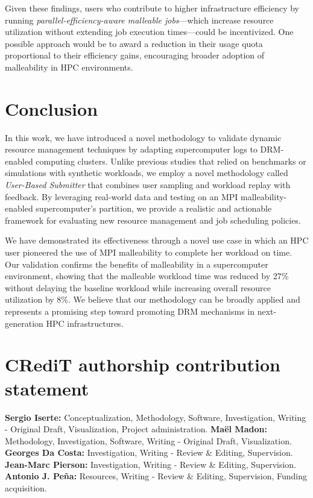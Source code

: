 \documentclass[a4paper,fleqn]{cas-dc}
\begin{document}
Given these findings, users who contribute to higher infrastructure efficiency by running \textit{parallel-efficiency-aware malleable jobs}—which increase resource utilization without extending job execution times—could be incentivized. One possible approach would be to award a reduction in their usage quota proportional to their efficiency gains, encouraging broader adoption of malleability in HPC environments.  

\section{Conclusion}\label{sec:conclusion}
In this work, we have introduced a novel methodology to validate dynamic resource management techniques by adapting supercomputer logs to DRM-enabled computing clusters.
Unlike previous studies that relied on benchmarks or simulations with synthetic workloads, we employ a novel methodology called \textit{User-Based Submitter} that combines user sampling and workload replay with feedback.
By leveraging real-world data and testing on an MPI malleability-enabled supercomputer's partition, we provide a realistic and actionable framework for evaluating new resource management and job scheduling policies.

We have demonstrated its effectiveness through a novel use case in which an HPC user pioneered the use of MPI malleability to complete her workload on time. Our validation confirms the benefits of malleability in a supercomputer environment, showing that the malleable workload time was reduced by 27\% without delaying the baseline workload while increasing overall resource utilization by 8\%. We believe that our methodology can be broadly applied and represents a promising step toward promoting DRM mechanisms in next-generation HPC infrastructures.


\section*{CRediT authorship contribution statement}
\textbf{Sergio Iserte:} Conceptualization, Methodology, Software,
Investigation, Writing - Original Draft, Visualization, Project administration.
\textbf{Maël Madon:}  Methodology, Investigation, Software, Writing - Original Draft, Visualization.
\textbf{Georges Da Costa:} Investigation, Writing - Review \& Editing, Supervision.
\textbf{Jean-Marc Pierson:} Investigation, Writing - Review \& Editing, Supervision.
\textbf{Antonio J. Peña:} Resources, Writing - Review \& Editing, Supervision, Funding acquisition.
\end{document}
